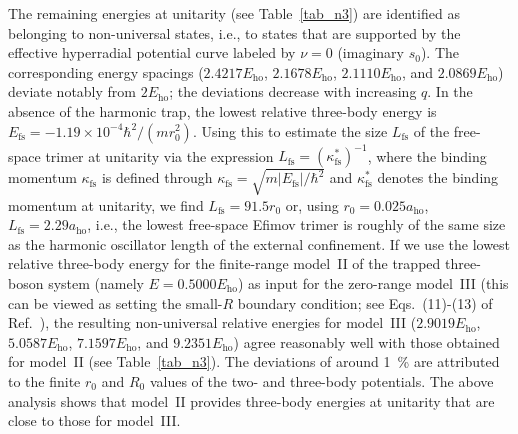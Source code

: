 \documentclass[aps,pra,twocolumn,showpacs,superscriptaddress]{revtex4}
\begin{document}
The remaining energies at unitarity (see Table~\ref{tab_n3})
are identified as belonging to
non-universal states, i.e., to states that are supported
by the effective hyperradial potential curve labeled by
$\nu=0$ (imaginary $s_0$).
The corresponding energy spacings  ($2.4217 E_{\text{ho}}$,
$2.1678 E_{\text{ho}}$,
$2.1110 E_{\text{ho}}$,
and $2.0869 E_{\text{ho}}$)
deviate notably from $2 E_{\text{ho}}$;
the deviations decrease
with increasing $q$.
In the absence of the harmonic trap, the lowest
relative three-body energy is 
$E_{\text{fs}}=-1.19 \times 10^{-4} \hbar^2/(m r_0^2) $. 
Using this to estimate the size $L_{\text{fs}}$ of the free-space trimer
at unitarity
via the expression $L_{\text{fs}}=(\kappa^*_{\text{fs}})^{-1}$,
where the binding momentum $\kappa_{\text{fs}}$ is defined through
$\kappa_{\text{fs}}=\sqrt{m |E_{\text{fs}}|/\hbar^2}$
and $\kappa_{\text{fs}}^*$ denotes the binding momentum at unitarity,
we find 
$L_{\text{fs}}=91.5r_0$ or, 
using $r_0=0.025a_{\text{ho}}$, $L_{\text{fs}}=2.29 a_{\text{ho}}$,
i.e., the lowest free-space Efimov trimer is roughly
of the same size as the harmonic oscillator
length of the external confinement.
If we use the lowest relative 
three-body energy for the finite-range
model~II of the trapped three-boson system
(namely $E=0.5000 E_{\text{ho}}$) as input for
the zero-range model~III
(this can be viewed as setting the small-$R$ boundary condition;
see Eqs.~(11)-(13) of Ref.~\cite{wernerPRL2006}),
the resulting non-universal
relative
energies for model~III ($2.9019 E_{\text{ho}}$, $5.0587 E_{\text{ho}}$, 
$7.1597 E_{\text{ho}}$, 
and
$9.2351 E_{\text{ho}}$)
agree reasonably
well with those obtained for model~II (see Table~\ref{tab_n3}).
The deviations of around 1~\% are
attributed to the finite 
$r_0$ and $R_0$ values of the two- and three-body potentials.
The above analysis shows that 
model~II provides three-body energies at unitarity that are close
to those for model~III. 
\end{document}

